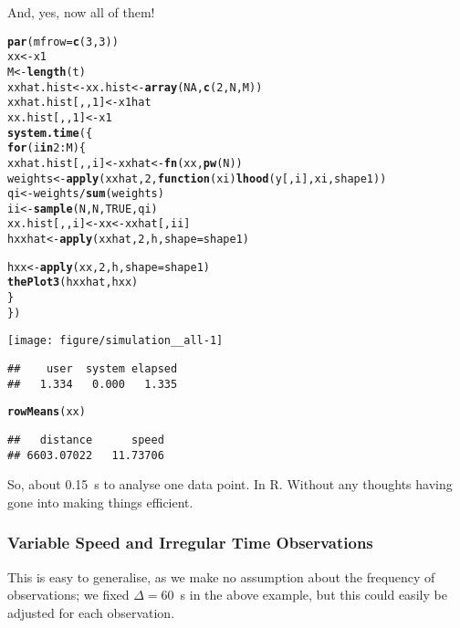 \documentclass[11pt]{article}\usepackage[]{graphicx}\usepackage[]{color}
\makeatletter
\def\maxwidth{ %
  \ifdim\Gin@nat@width>\linewidth
    \linewidth
  \else
    \Gin@nat@width
  \fi
}
\newcommand{\hlnum}[1]{\textcolor[rgb]{0.686,0.059,0.569}{#1}}%
\newcommand{\hlopt}[1]{\textcolor[rgb]{0,0,0}{#1}}%
\newcommand{\hlstd}[1]{\textcolor[rgb]{0.345,0.345,0.345}{#1}}%
\newcommand{\hlkwa}[1]{\textcolor[rgb]{0.161,0.373,0.58}{\textbf{#1}}}%
\newcommand{\hlkwb}[1]{\textcolor[rgb]{0.69,0.353,0.396}{#1}}%
\newcommand{\hlkwc}[1]{\textcolor[rgb]{0.333,0.667,0.333}{#1}}%
\newcommand{\hlkwd}[1]{\textcolor[rgb]{0.737,0.353,0.396}{\textbf{#1}}}%
\newenvironment{kframe}{%
 \def\at@end@of@kframe{}%
 \ifinner\ifhmode%
  \def\at@end@of@kframe{\end{minipage}}%
  \begin{minipage}{\columnwidth}%
 \fi\fi%
 \def\FrameCommand##1{\hskip\@totalleftmargin \hskip-\fboxsep
 \colorbox{shadecolor}{##1}\hskip-\fboxsep
     \hskip-\linewidth \hskip-\@totalleftmargin \hskip\columnwidth}%
 \MakeFramed {\advance\hsize-\width
   \@totalleftmargin\z@ \linewidth\hsize
   \@setminipage}}%
 {\par\unskip\endMakeFramed%
 \at@end@of@kframe}
\newenvironment{knitrout}{}{} %
\makeatother
\begin{document}
And, yes, now all of them!

\begin{knitrout}
\color{fgcolor}\begin{kframe}
\begin{alltt}
\hlkwd{par}\hlstd{(}\hlkwc{mfrow} \hlstd{=} \hlkwd{c}\hlstd{(}\hlnum{3}\hlstd{,} \hlnum{3}\hlstd{))}
\hlstd{xx} \hlkwb{<-} \hlstd{x1}
\hlstd{M} \hlkwb{<-} \hlkwd{length}\hlstd{(t)}
\hlstd{xxhat.hist} \hlkwb{<-} \hlstd{xx.hist} \hlkwb{<-} \hlkwd{array}\hlstd{(}\hlnum{NA}\hlstd{,} \hlkwd{c}\hlstd{(}\hlnum{2}\hlstd{, N, M))}
\hlstd{xxhat.hist[,,}\hlnum{1}\hlstd{]} \hlkwb{<-} \hlstd{x1hat}
\hlstd{xx.hist[,,}\hlnum{1}\hlstd{]} \hlkwb{<-} \hlstd{x1}
\hlkwd{system.time}\hlstd{(\{}
    \hlkwa{for} \hlstd{(i} \hlkwa{in} \hlnum{2}\hlopt{:}\hlstd{M) \{}
        \hlstd{xxhat.hist[,,i]} \hlkwb{<-} \hlstd{xxhat} \hlkwb{<-} \hlkwd{fn}\hlstd{(xx,} \hlkwd{pw}\hlstd{(N))}
        \hlstd{weights} \hlkwb{<-} \hlkwd{apply}\hlstd{(xxhat,} \hlnum{2}\hlstd{,} \hlkwa{function}\hlstd{(}\hlkwc{xi}\hlstd{)} \hlkwd{lhood}\hlstd{(y[, i], xi, shape1))}
        \hlstd{qi} \hlkwb{<-} \hlstd{weights} \hlopt{/} \hlkwd{sum}\hlstd{(weights)}
        \hlstd{ii} \hlkwb{<-} \hlkwd{sample}\hlstd{(N, N,} \hlnum{TRUE}\hlstd{, qi)}
        \hlstd{xx.hist[,,i]} \hlkwb{<-} \hlstd{xx} \hlkwb{<-} \hlstd{xxhat[, ii]}
        \hlstd{hxxhat} \hlkwb{<-} \hlkwd{apply}\hlstd{(xxhat,} \hlnum{2}\hlstd{, h,} \hlkwc{shape} \hlstd{= shape1)}

        \hlstd{hxx} \hlkwb{<-} \hlkwd{apply}\hlstd{(xx,} \hlnum{2}\hlstd{, h,} \hlkwc{shape} \hlstd{= shape1)}
        \hlkwd{thePlot3}\hlstd{(hxxhat, hxx)}
    \hlstd{\}}
\hlstd{\})}
\end{alltt}
\end{kframe}

{\centering \texttt{[image: figure/simulation\_\_all-1]} 

}


\begin{kframe}\begin{verbatim}
##    user  system elapsed 
##   1.334   0.000   1.335
\end{verbatim}
\begin{alltt}
\hlkwd{rowMeans}\hlstd{(xx)}
\end{alltt}
\begin{verbatim}
##   distance      speed 
## 6603.07022   11.73706
\end{verbatim}
\end{kframe}
\end{knitrout}

So, about 0.15~s to analyse one data point. In R. Without any thoughts having gone into making
things efficient.


\subsubsection{Variable Speed and Irregular Time Observations}

This is easy to generalise, as we make no assumption about the frequency of observations;
we fixed $\Delta = 60$~s in the above example, but this could easily be adjusted for each observation.
\end{document}
